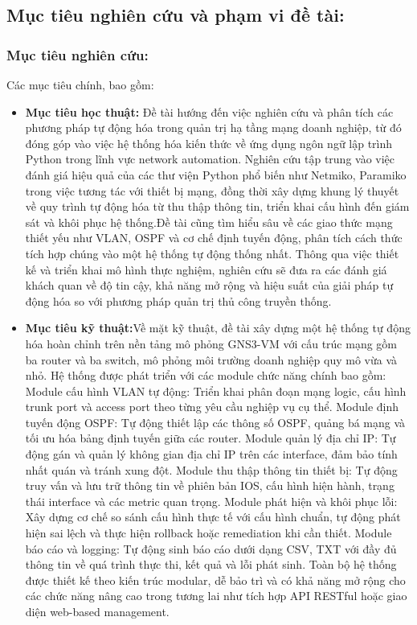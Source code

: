 \subsection{ Mục tiêu nghiên cứu và phạm vi đề tài:}
\subsubsection{Mục tiêu nghiên cứu:}
Các mục tiêu chính, bao gồm:
\begin{itemize}
    \item \textbf{Mục tiêu học thuật:} Đề tài hướng đến việc nghiên cứu và phân tích các phương pháp tự động hóa trong quản trị hạ tầng mạng doanh nghiệp, từ đó đóng góp vào việc hệ thống hóa kiến thức về ứng dụng ngôn ngữ lập trình Python trong lĩnh vực network automation. Nghiên cứu tập trung vào việc đánh giá hiệu quả của các thư viện Python phổ biến như Netmiko, Paramiko trong việc tương tác với thiết bị mạng\cite{CloudMyLab-2025}, đồng thời xây dựng khung lý thuyết về quy trình tự động hóa từ thu thập thông tin, triển khai cấu hình đến giám sát và khôi phục hệ thống.Đề tài cũng tìm hiểu sâu về các giao thức mạng thiết yếu như VLAN, OSPF và cơ chế định tuyến động, phân tích cách thức tích hợp chúng vào một hệ thống tự động thống nhất. Thông qua việc thiết kế và triển khai mô hình thực nghiệm, nghiên cứu sẽ đưa ra các đánh giá khách quan về độ tin cậy, khả năng mở rộng và hiệu suất của giải pháp tự động hóa so với phương pháp quản trị thủ công truyền thống.
    \item \textbf{Mục tiêu kỹ thuật:}Về mặt kỹ thuật, đề tài xây dựng một hệ thống tự động hóa hoàn chỉnh trên nền tảng mô phỏng GNS3-VM\cite{GNS3-Homepage} với cấu trúc mạng gồm ba router và ba switch, mô phỏng môi trường doanh nghiệp quy mô vừa và nhỏ. Hệ thống được phát triển với các module chức năng chính bao gồm:
    Module cấu hình VLAN tự động: Triển khai phân đoạn mạng logic, cấu hình trunk port và access port theo từng yêu cầu nghiệp vụ cụ thể.
    Module định tuyến động OSPF\cite{Cisco-OSPF-7039-1}: Tự động thiết lập các thông số OSPF, quảng bá mạng và tối ưu hóa bảng định tuyến giữa các router.
    Module quản lý địa chỉ IP\cite{GeeksforGeeks-ClassfulIP}: Tự động gán và quản lý không gian địa chỉ IP trên các interface, đảm bảo tính nhất quán và tránh xung đột.
    Module thu thập thông tin thiết bị: Tự động truy vấn và lưu trữ thông tin về phiên bản IOS, cấu hình hiện hành, trạng thái interface và các metric quan trọng.
    Module phát hiện và khôi phục lỗi: Xây dựng cơ chế so sánh cấu hình thực tế với cấu hình chuẩn, tự động phát hiện sai lệch và thực hiện rollback hoặc remediation khi cần thiết.
    Module báo cáo và logging: Tự động sinh báo cáo dưới dạng CSV, TXT với đầy đủ thông tin về quá trình thực thi, kết quả và lỗi phát sinh.
    Toàn bộ hệ thống được thiết kế theo kiến trúc modular, dễ bảo trì và có khả năng mở rộng cho các chức năng nâng cao trong tương lai như tích hợp API RESTful hoặc giao diện web-based management.


\end{itemize}
